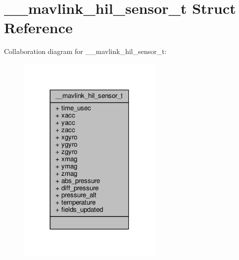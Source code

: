 \hypertarget{struct____mavlink__hil__sensor__t}{\section{\+\_\+\+\_\+mavlink\+\_\+hil\+\_\+sensor\+\_\+t Struct Reference}
\label{struct____mavlink__hil__sensor__t}
}


Collaboration diagram for \+\_\+\+\_\+mavlink\+\_\+hil\+\_\+sensor\+\_\+t\+:
\nopagebreak
\begin{figure}[H]
\begin{center}
\leavevmode
\includegraphics[width=199pt]{struct____mavlink__hil__sensor__t__coll__graph}
\end{center}
\end{figure}
